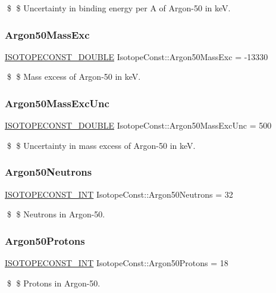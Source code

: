 \$ \$ Uncertainty in binding energy per A of Argon-\/50 in keV. \mbox{\label{group___isotope_const-_argon-_ar50_gab1791b8070105481dee1f14c28248531}} 
\subsubsection{\texorpdfstring{Argon50\+Mass\+Exc}{Argon50MassExc}}
{\footnotesize\ttfamily \mbox{\hyperlink{group___isotope_const-_macros_ga8f45a7272ce02c0b4c65c44636ed719a}{I\+S\+O\+T\+O\+P\+E\+C\+O\+N\+S\+T\+\_\+\+D\+O\+U\+B\+LE}} Isotope\+Const\+::\+Argon50\+Mass\+Exc = -\/13330}

\$ \$ Mass excess of Argon-\/50 in keV. \mbox{\label{group___isotope_const-_argon-_ar50_ga26a3dfcdc0caf1e1864fe63f29e318ef}} 
\subsubsection{\texorpdfstring{Argon50\+Mass\+Exc\+Unc}{Argon50MassExcUnc}}
{\footnotesize\ttfamily \mbox{\hyperlink{group___isotope_const-_macros_ga8f45a7272ce02c0b4c65c44636ed719a}{I\+S\+O\+T\+O\+P\+E\+C\+O\+N\+S\+T\+\_\+\+D\+O\+U\+B\+LE}} Isotope\+Const\+::\+Argon50\+Mass\+Exc\+Unc = 500}

\$ \$ Uncertainty in mass excess of Argon-\/50 in keV. \mbox{\label{group___isotope_const-_argon-_ar50_gaeab20f56f2d542b0efd4c0a33dce5dee}} 
\subsubsection{\texorpdfstring{Argon50\+Neutrons}{Argon50Neutrons}}
{\footnotesize\ttfamily \mbox{\hyperlink{group___isotope_const-_macros_ga5f18360b3e99483a35c32d789e62621c}{I\+S\+O\+T\+O\+P\+E\+C\+O\+N\+S\+T\+\_\+\+I\+NT}} Isotope\+Const\+::\+Argon50\+Neutrons = 32}

\$ \$ Neutrons in Argon-\/50. \mbox{\label{group___isotope_const-_argon-_ar50_ga698ba2bf26cb505b8671d3a7cc4d3359}} 
\subsubsection{\texorpdfstring{Argon50\+Protons}{Argon50Protons}}
{\footnotesize\ttfamily \mbox{\hyperlink{group___isotope_const-_macros_ga5f18360b3e99483a35c32d789e62621c}{I\+S\+O\+T\+O\+P\+E\+C\+O\+N\+S\+T\+\_\+\+I\+NT}} Isotope\+Const\+::\+Argon50\+Protons = 18}

\$ \$ Protons in Argon-\/50. 